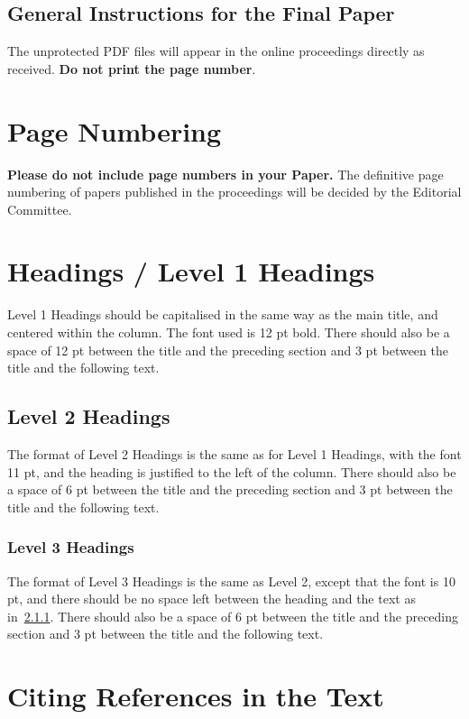 \documentclass[10pt, a4paper]{article}
\begin{document}
\subsection{General Instructions for the Final Paper}

The unprotected PDF files will appear in the online proceedings directly as received. \textbf{Do not print the page number}.

\section{Page Numbering}

\textbf{Please do not include page numbers in your Paper.} The definitive page numbering of papers published in the proceedings will be decided by the Editorial Committee.

\section{Headings / Level 1 Headings} 

Level 1 Headings should be capitalised in the same way as the main title, and centered within the column. The font used is 12 pt bold. There should also be a space of 12 pt between the title and the preceding section and 3 pt between the title and the following text.

\subsection{Level 2 Headings}

The format of Level 2 Headings is the same as for Level 1 Headings, with the font  11 pt, and the heading is justified to the left of the column. There should also be a space of 6 pt between the title and the preceding section and 3 pt between the title and the following text.

\subsubsection{Level 3 Headings}
\label{level3H}

The format of Level 3 Headings is the same as Level 2, except that the font is  10 pt, and there should be no space left between the heading and the text as in~\ref{level3H}. There should also be a space of 6 pt between the title and the preceding section and 3 pt between the title and the following text.

\section{Citing References in the Text}
\end{document}
